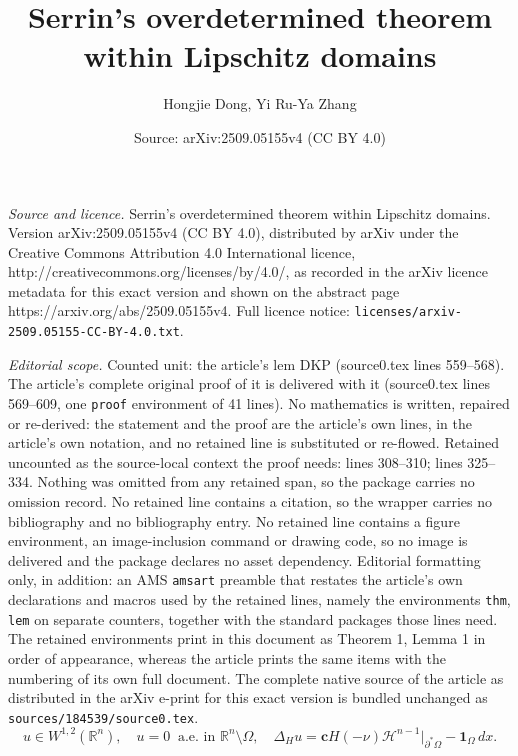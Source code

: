 \documentclass[10pt,a4paper]{amsart}
\title{Serrin's overdetermined theorem within Lipschitz domains}
\author{Hongjie Dong, Yi Ru-Ya Zhang}
\date{Source: arXiv:2509.05155v4 (CC BY 4.0)}
\newcommand{\R}{\mathbb{R}}
\begin{document}
\maketitle

\noindent\emph{Source and licence.} Serrin's overdetermined theorem within Lipschitz domains. Version arXiv:2509.05155v4 (CC BY 4.0), distributed by arXiv under the Creative Commons Attribution 4.0 International licence, http://creativecommons.org/licenses/by/4.0/, as recorded in the arXiv licence metadata for this exact version and shown on the abstract page https://arxiv.org/abs/2509.05155v4. Full licence notice: \texttt{licenses/arxiv-2509.05155-CC-BY-4.0.txt}.\par\smallskip

\noindent\textit{Editorial scope.} Counted unit: the article's lem DKP (source0.tex lines 559--568). The article's complete original proof of it is delivered with it (source0.tex lines 569--609, one \texttt{proof} environment of 41 lines). No mathematics is written, repaired or re-derived: the statement and the proof are the article's own lines, in the article's own notation, and no retained line is substituted or re-flowed.  Retained uncounted as the source-local context the proof needs: lines 308--310; lines 325--334.  Nothing was omitted from any retained span, so the package carries no omission record.  No retained line contains a citation, so the wrapper carries no bibliography and no bibliography entry.  No retained line contains a figure environment, an image-inclusion command or drawing code, so no image is delivered and the package declares no asset dependency.  Editorial formatting only, in addition: an AMS \texttt{amsart} preamble that restates the article's own declarations and macros used by the retained lines, namely the environments \texttt{thm}, \texttt{lem} on separate counters, together with the standard packages those lines need.  The retained environments print in this document as Theorem 1, Lemma 1 in order of appearance, whereas the article prints the same items with the numbering of its own full document.  The complete native source of the article as distributed in the arXiv e-print for this exact version is bundled unchanged as \texttt{sources/184539/source0.tex}.
\begin{equation}\label{weak wulff u}
   u \in W^{1,2}(\mathbb R^n), \quad  u=0\  \text{ a.e. in }\R^n\setminus \Omega,\quad \Delta_H u=\mathbf{c}H(-\nu)\mathscr{H}^{n-1}|_{\partial^*\Omega} - \mathbf{1}_{\Omega}\,dx. 
\end{equation} 
\end{document}
